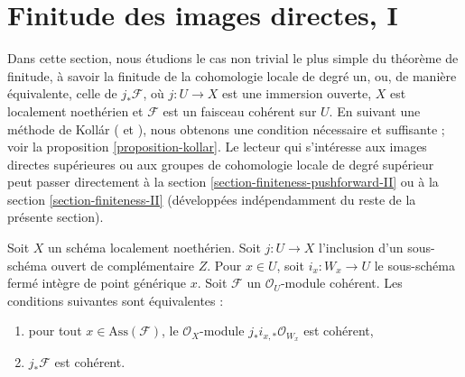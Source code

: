 \section{Finitude des images directes, I}
\label{section-finiteness-pushforward}

\noindent
Dans cette section, nous étudions le cas non trivial le plus simple du théorème de finitude, à savoir la finitude de la cohomologie locale de degré un, ou, de manière équivalente, celle de $j_*\mathcal{F}$, où $j : U \to X$ est une immersion ouverte, $X$ est localement noethérien et $\mathcal{F}$ est un faisceau cohérent sur $U$. En suivant une méthode de Koll\'ar (\cite{Kollar-variants} et \cite{Kollar-local-global-hulls}), nous obtenons une condition nécessaire et suffisante ; voir la proposition \ref{proposition-kollar}. Le lecteur qui s'intéresse aux images directes supérieures ou aux groupes de cohomologie locale de degré supérieur peut passer directement à la section \ref{section-finiteness-pushforward-II} ou à la section \ref{section-finiteness-II} (développées indépendamment du reste de la présente section).

\begin{lemma}
\label{lemma-check-finiteness-pushforward-on-associated-points}
Soit $X$ un schéma localement noethérien. Soit $j : U \to X$ l'inclusion d'un sous-schéma ouvert de complémentaire $Z$. Pour $x \in U$, soit $i_x : W_x \to U$ le sous-schéma fermé intègre de point générique $x$. Soit $\mathcal{F}$ un $\mathcal{O}_U$-module cohérent. Les conditions suivantes sont équivalentes :
\begin{enumerate}
\item pour tout $x \in \text{Ass}(\mathcal{F})$, le $\mathcal{O}_X$-module $j_*i_{x, *}\mathcal{O}_{W_x}$ est cohérent,
\item $j_*\mathcal{F}$ est cohérent.
\end{enumerate}
\end{lemma}

